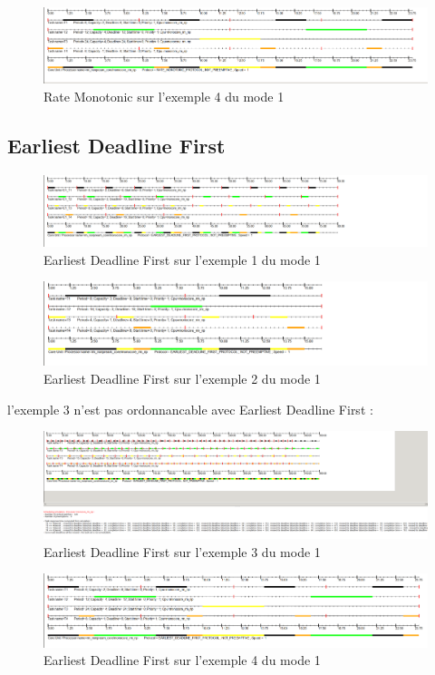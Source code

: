 {{    \begin{figure}[H]
      \centering
      \includegraphics[width=16cm]{
        img/mode1/rm/ex4.png
      }
      \caption{Rate Monotonic sur l'exemple 4 du mode 1}
    \end{figure}
  }

  \subsection{Earliest Deadline First}{
    \begin{figure}[H]
      \centering
      \includegraphics[width=16cm]{
        img/mode1/edf/ex1.png
      }
      \caption{Earliest Deadline First sur l'exemple 1 du mode 1}
    \end{figure}

    \begin{figure}[H]
      \centering
      \includegraphics[width=16cm]{
        img/mode1/edf/ex2.png
      }
      \caption{Earliest Deadline First sur l'exemple 2 du mode 1}
    \end{figure}

    l'exemple 3 n'est pas ordonnancable avec Earliest Deadline First :
    \begin{figure}[H]
      \centering
      \includegraphics[width=16cm]{
        img/mode1/edf/ex3_no.png
      }
      \caption{Earliest Deadline First sur l'exemple 3 du mode 1}
    \end{figure}
    \bigskip

    \begin{figure}[H]
      \centering
      \includegraphics[width=16cm]{
        img/mode1/edf/ex4.png
      }
      \caption{Earliest Deadline First sur l'exemple 4 du mode 1}
    \end{figure}
  }
 }

\newpage
